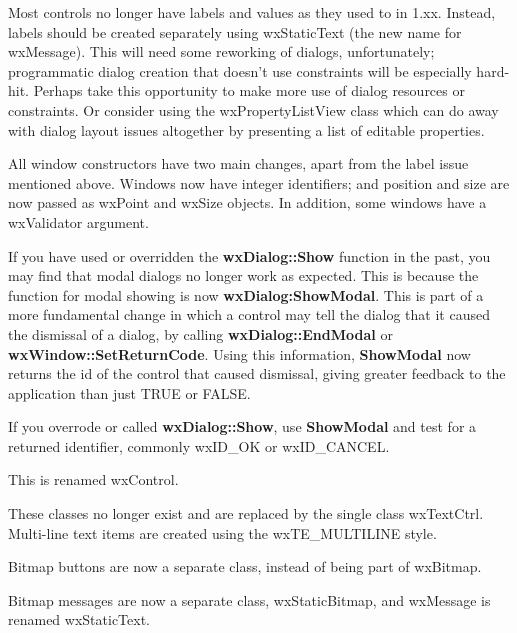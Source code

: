 
Most controls no longer have labels and values as they used to in 1.xx. Instead, labels
should be created separately using wxStaticText (the new name for wxMessage). This will
need some reworking of dialogs, unfortunately; programmatic dialog creation that doesn't
use constraints will be especially hard-hit. Perhaps take this opportunity to make more
use of dialog resources or constraints. Or consider using the wxPropertyListView class
which can do away with dialog layout issues altogether by presenting a list of editable
properties.


All window constructors have two main changes, apart from the label issue mentioned above.
Windows now have integer identifiers; and position and size are now passed as wxPoint and
wxSize objects. In addition, some windows have a wxValidator argument.


If you have used or overridden the {\bf wxDialog::Show} function in the past, you may find
that modal dialogs no longer work as expected. This is because the function for modal showing
is now {\bf wxDialog:ShowModal}. This is part of a more fundamental change in which a
control may tell the dialog that it caused the dismissal of a dialog, by
calling {\bf wxDialog::EndModal} or {\bf wxWindow::SetReturnCode}. Using this
information, {\bf ShowModal} now returns the id of the control that caused dismissal,
giving greater feedback to the application than just TRUE or FALSE.

If you overrode or called {\bf wxDialog::Show}, use {\bf ShowModal} and test for a returned identifier,
commonly wxID\_OK or wxID\_CANCEL.


This is renamed wxControl.


These classes no longer exist and are replaced by the single class wxTextCtrl.
Multi-line text items are created using the wxTE\_MULTILINE style.


Bitmap buttons are now a separate class, instead of being part of wxBitmap.


Bitmap messages are now a separate class, wxStaticBitmap, and wxMessage
is renamed wxStaticText.

